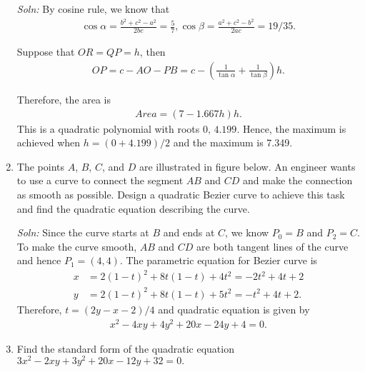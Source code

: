 \documentclass{article}
\begin{document}
\begin{enumerate}
  \emph{Soln:} By cosine rule, we know that
  \begin{align*}
    \cos \alpha = \frac{ b^2+c^2-a^2}{2bc}=\frac{5}{7}, \cos \beta = \frac{ a^2+c^2-b^2}{2ac} = 19/35.
  \end{align*}

  Suppose that $OR = QP = h$, then
  \begin{align*}
    OP = c - AO - PB = c - \left(\frac{1}{\tan\alpha}+\frac{1}{\tan\beta}\right)h.
  \end{align*}

  Therefore, the area is
  \begin{align*}
    Area = (7-1.667 h ) h . 
  \end{align*}
  This is a quadratic polynomial with roots $0,\,4.199$. Hence, the maximum is achieved when $h = (0+4.199)/2$ and the maximum is 7.349.
\newpage
\item The points $A$, $B$, $C$, and $D$ are illustrated in figure below. An engineer wants to use a curve to connect the segment $AB$ and $CD$ and make the connection as smooth as possible. Design a quadratic Bezier curve to achieve this task and find the quadratic equation describing the curve.

  \begin{figure}[ht]
    \centering
  \end{figure}

  \emph{Soln:} Since the curve starts at $B$ and ends at $C$, we know $P_0 = B$ and $P_2 = C$. To make the curve smooth, $AB$ and $CD$ are both tangent lines of the curve and hence $P_1 =(4,4) $. The parametric equation for Bezier curve is
  \begin{align*}
    x &= 2(1-t)^2 + 8t(1-t)+4t^2 = -2t^2+4t+2  \\
    y &= 2(1-t)^2 + 8t(1-t)+5t^2 = -t^2+4t+2.
  \end{align*}
  Therefore, $t = (2y-x-2)/4$ and quadratic equation is given by
  \begin{align*}
   x^2-4xy+4y^2+20x-24y+4=0. 
  \end{align*}
\newpage
\item Find the standard form of the quadratic equation $3x^2 - 2xy + 3y^2 + 20x -12y +32 = 0.$


\end{enumerate}
\end{document}
